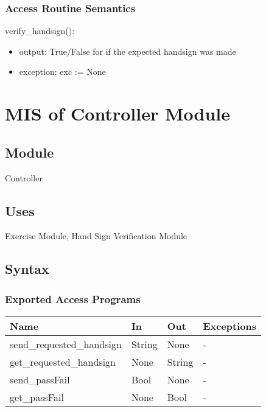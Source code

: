 \documentclass[12pt, titlepage]{article}
\begin{document}
\subsubsection{Access Routine Semantics}
\noindent verify\_handsign():
\begin{itemize}
\item output: True/False for if the expected handsign was made 
\item exception: exc := None 
\end{itemize}


\section{MIS of Controller Module} \label{Module} 
\subsection{Module}
Controller
\subsection{Uses}
Exercise Module, Hand Sign Verification Module
\subsection{Syntax}
\subsubsection{Exported Access Programs}
\begin{center}
\begin{tabular}{p{5cm} p{2cm} p{2cm} p{2cm}}
\hline
\textbf{Name} & \textbf{In} & \textbf{Out} & \textbf{Exceptions} \\
\hline
send\_requested\_handsign & String & None & - \\
get\_requested\_handsign & None & String & - \\
send\_passFail & Bool & None & - \\
get\_passFail & None & Bool & - \\
\hline
\end{tabular}
\end{center}
\end{document}

